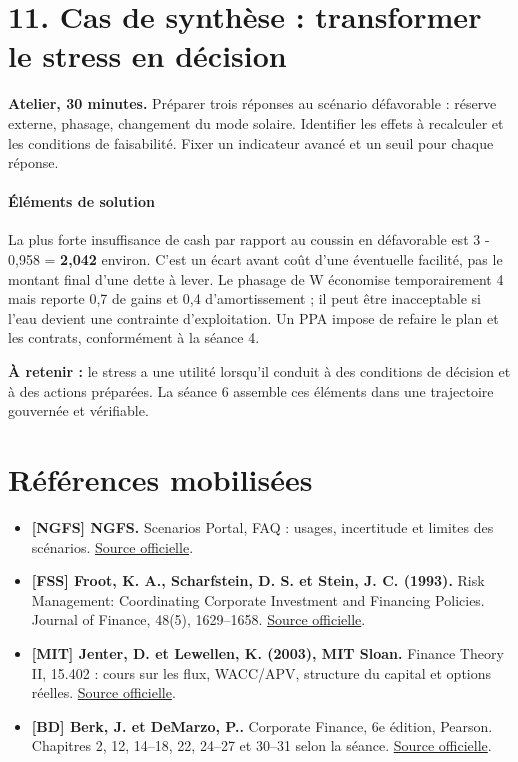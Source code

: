 \documentclass[12pt,a4paper]{article}
\begin{document}
\section*{11. Cas de synthèse : transformer le stress en décision}
\textbf{Atelier, 30 minutes.} Préparer trois réponses au scénario défavorable : réserve externe, phasage, changement du mode solaire. Identifier les effets à recalculer et les conditions de faisabilité. Fixer un indicateur avancé et un seuil pour chaque réponse.



\paragraph{Éléments de solution}
La plus forte insuffisance de cash par rapport au coussin en défavorable est 3 - 0,958 = \textbf{2,042} environ. C’est un écart avant coût d’une éventuelle facilité, pas le montant final d’une dette à lever. Le phasage de W économise temporairement 4 mais reporte 0,7 de gains et 0,4 d’amortissement ; il peut être inacceptable si l’eau devient une contrainte d’exploitation. Un PPA impose de refaire le plan et les contrats, conformément à la séance 4.


\textbf{À retenir :} le stress a une utilité lorsqu’il conduit à des conditions de décision et à des actions préparées. La séance 6 assemble ces éléments dans une trajectoire gouvernée et vérifiable.

\section*{Références mobilisées}
\small
\begin{itemize}
\item \textbf{[NGFS] NGFS.} Scenarios Portal, FAQ : usages, incertitude et limites des scénarios. \href{https://www.ngfs.net/ngfs-scenarios-portal/faq/}{Source officielle}.
\item \textbf{[FSS] Froot, K. A., Scharfstein, D. S. et Stein, J. C. (1993).} Risk Management: Coordinating Corporate Investment and Financing Policies. Journal of Finance, 48(5), 1629--1658. \href{https://doi.org/10.1111/j.1540-6261.1993.tb05123.x}{Source officielle}.
\item \textbf{[MIT] Jenter, D. et Lewellen, K. (2003), MIT Sloan.} Finance Theory II, 15.402 : cours sur les flux, WACC/APV, structure du capital et options réelles. \href{https://ocw.mit.edu/courses/15-402-finance-theory-ii-spring-2003/pages/lecture-notes/}{Source officielle}.
\item \textbf{[BD] Berk, J. et DeMarzo, P..} Corporate Finance, 6e édition, Pearson. Chapitres 2, 12, 14--18, 22, 24--27 et 30--31 selon la séance. \href{https://www.pearson.com/en-us/subject-catalog/p/corporate-finance/P200000009791/9780137844906}{Source officielle}.
\end{itemize}\normalsize
\end{document}
